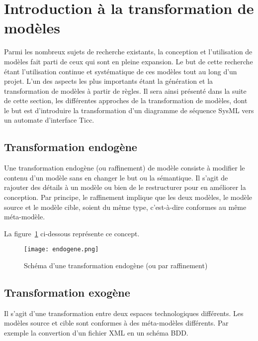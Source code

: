 \section{Introduction {\`a} la transformation de mod{\`e}les}

Parmi les nombreux sujets de recherche existants, la conception et l'utilisation de mod{\`e}les fait parti de ceux qui sont en pleine expansion. Le but de cette recherche {\'e}tant l'utilisation continue et syst{\'e}matique de ces mod{\`e}les tout au long d'un projet. L'un des aspects les plus importants {\'e}tant la g{\'e}n{\'e}ration et la transformation de mod{\`e}les {\`a} partir de r{\`e}gles. Il sera ainsi pr{\'e}sent{\'e} dans la suite de cette section, les diff{\'e}rentes approches de la transformation de mod{\`e}les, dont le but est d'introduire la transformation d'un diagramme de s{\'e}quence SysML vers un automate d'interface Ticc.

\subsection{Transformation endog{\`e}ne}
Une transformation endog{\`e}ne (ou raffinement) de mod{\`e}le consiste {\`a} modifier le contenu d'un mod{\`e}le sans en changer le but ou la s{\'e}mantique. Il s'agit de rajouter des d{\'e}tails {\`a} un mod{\`e}le ou bien de le restructurer pour en am{\'e}liorer la conception. Par principe, le raffinement implique que les deux mod{\`e}les, le mod{\`e}le source et le mod{\`e}le cible, soient du m{\^e}me type, c'est-{\`a}-dire conformes au m{\^e}me m{\'e}ta-mod{\`e}le.

\noindent La figure~\ref{raffinement} ci-dessous repr{\'e}sente ce concept.

\begin{figure}[!ht]
	\centering
	\texttt{[image: endogene.png]}
	\caption{Sch{\'e}ma d'une transformation endog{\`e}ne (ou par raffinement)}
	\label{raffinement}

\end{figure}

\subsection{Transformation exog{\`e}ne}
Il s'agit d'une transformation entre deux espaces technologiques diff{\'e}rents. Les mod{\`e}les source et cible sont conformes {\`a} des m{\'e}ta-mod{\`e}les diff{\'e}rents. Par exemple la convertion d'un fichier XML en un sch{\'e}ma BDD.

